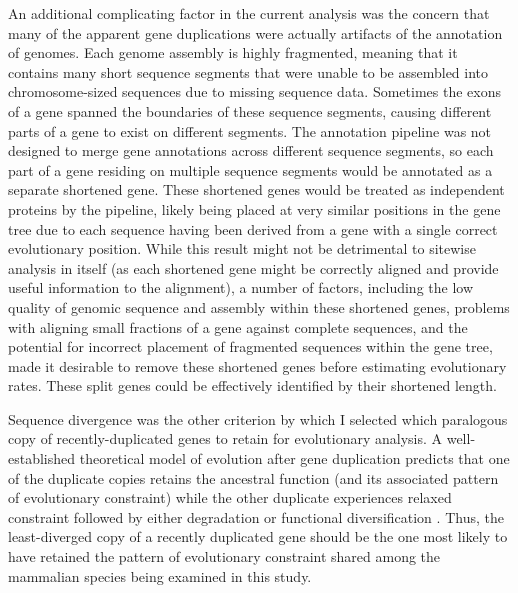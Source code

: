An additional complicating factor
in the current analysis was the concern that many of the apparent gene
duplications were actually artifacts of the annotation of \lcv
genomes. Each \lcv genome assembly is highly fragmented, meaning that
it contains many short sequence segments that were unable to be
assembled into chromosome-sized sequences due to missing sequence
data. Sometimes the exons of a gene spanned the boundaries of these
sequence segments, causing different parts of a gene to exist on
different segments. The \ens annotation pipeline was not designed to
merge gene annotations across different sequence segments, so each
part of a gene residing on multiple sequence segments would be
annotated as a separate shortened gene. These shortened genes would be
treated as independent proteins by the \cmp pipeline, likely being
placed at very similar positions in the gene tree due to each sequence
having been derived from a gene with a single correct evolutionary
position. While this result might not be detrimental to sitewise
analysis in itself (as each shortened gene might be correctly aligned
and provide useful information to the alignment), a number of factors,
including the low quality of genomic sequence and assembly within
these shortened genes, problems with aligning small fractions of a
gene against complete sequences, and the potential for incorrect
placement of fragmented sequences within the gene tree, made it
desirable to remove these shortened genes before estimating
evolutionary rates. These split genes could be effectively identified
by their shortened length.

Sequence divergence was the other criterion by which I selected which
paralogous copy of recently-duplicated genes to retain for
evolutionary analysis. A well-established theoretical model of
evolution after gene duplication predicts that one of the duplicate
copies retains the ancestral function (and its associated pattern of
evolutionary constraint) while the other duplicate experiences relaxed
constraint followed by either degradation or functional
diversification \citep{Han2009}. Thus, the least-diverged copy of a
recently duplicated gene should be the one most likely to have
retained the pattern of evolutionary constraint shared among the
mammalian species being examined in this study.

